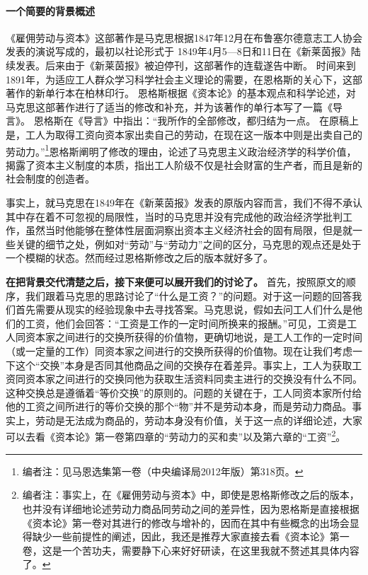\documentclass[a4paper,twoside,12pt,AutoFakeBold]{ctexart}
\begin{document}
\paragraph{一个简要的背景概述}\begin{fangsong}
《雇佣劳动与资本》这部著作是马克思根据1847年12月在布鲁塞尔德意志工人协会发表的演说写成的，最初以社论形式于 1849年4月5—8日和11日在《新莱茵报》陆续发表。后来由于《新莱茵报》被迫停刊，这部著作的连载遂告中断。 
时间来到1891年，为适应工人群众学习科学社会主义理论的需要，在恩格斯的关心下，这部著作的新单行本在柏林印行。 恩格斯根据《资本论》的基本观点和科学论述，对马克思这部著作进行了适当的修改和补充，并为该著作的单行本写了一篇《导言》。 恩格斯在《导言》中指出：“我所作的全部修改，都归结为一点。 在原稿上是，工人为取得工资向资本家出卖自己的劳动，在现在这一版本中则是出卖自己的劳动力。”\footnote{编者注：见马恩选集第一卷（中央编译局2012年版）第318页。}恩格斯阐明了修改的理由，论述了马克思主义政治经济学的科学价值，揭露了资本主义制度的本质，指出工人阶级不仅是社会财富的生产者，而且是新的社会制度的创造者。
\end{fangsong}

事实上，就马克思在1849年在《新莱茵报》发表的原版内容而言，我们不得不承认其中存在着不可忽视的局限性，当时的马克思并没有完成他的政治经济学批判工作，虽然当时他能够在整体性层面洞察出资本主义经济社会的固有局限，但是就一些关键的细节之处，例如对“劳动”与“劳动力”之间的区分，马克思的观点还是处于一个模糊的状态。然而经过恩格斯修改之后的版本就好多了。

 \vspace{0.5cm} %
\textbf{在把背景交代清楚之后，接下来便可以展开我们的讨论了。}
首先，按照原文的顺序，我们跟着马克思的思路讨论了“什么是工资？”的问题。对于这一问题的回答我们首先需要从现实的经验现象中去寻找答案。马克思说，假如去问工人们什么是他们的工资，他们会回答：“工资是工作的一定时间所换来的报酬。”可见，工资是工人同资本家之间进行的交换所获得的价值物，更确切地说，是工人工作的一定时间（或一定量的工作）同资本家之间进行的交换所获得的价值物。现在让我们考虑一下这个“交换”本身是否同其他商品之间的交换存在着差异。事实上，工人为获取工资同资本家之间进行的交换同他为获取生活资料同卖主进行的交换没有什么不同。这种交换总是遵循着“等价交换”的原则的。问题的关键在于，工人同资本家所付给他的工资之间所进行的等价交换的那个“物”并不是劳动本身，而是劳动力商品。事实上，劳动是无法成为商品的，劳动本身没有价值，关于这一点的详细论述，大家可以去看《资本论》第一卷第四章的“劳动力的买和卖”以及第六章的“工资”\footnote{编者注：事实上，在《雇佣劳动与资本》中，即使是恩格斯修改之后的版本，也并没有详细地论述劳动力商品同劳动之间的差异性，因为恩格斯是直接根据《资本论》第一卷对其进行的修改与增补的，因而在其中有些概念的出场会显得缺少一些前提性的阐述，因此，我还是推荐大家直接去看《资本论》第一卷，这是一个苦功夫，需要静下心来好好研读，在这里我就不赘述其具体内容了。}。
\end{document}
